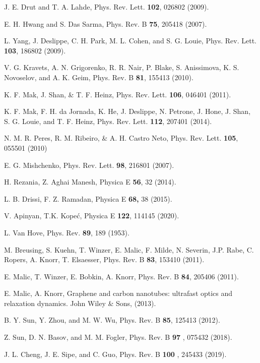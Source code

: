 \documentclass[reprint, superscriptaddress,  aps, pra]{revtex4-2}
\begin{document}
\begin{thebibliography}{99}
 J. E. Drut and T. A. Lahde, Phys. Rev. Lett. \textbf{102},
026802 (2009).

 E. H. Hwang and S. Das Sarma, Phys. Rev. B \textbf{75}, 205418
(2007).

 L. Yang, J. Deslippe, C. H. Park, M. L. Cohen, and S. G.
Louie, Phys. Rev. Lett. \textbf{103}, 186802 (2009).

 V. G. Kravets, A. N. Grigorenko, R. R. Nair, P. Blake, S.
Anissimova, K. S. Novoselov, and A. K. Geim, Phys. Rev. B \textbf{81},
155413 (2010).

 K. F. Mak, J. Shan, \& T. F. Heinz, Phys. Rev. Lett. \textbf{%
106}, 046401 (2011).

 K. F. Mak, F. H. da Jornada, K. He, J. Deslippe, N.
Petrone, J. Hone, J. Shan, S. G. Louie, and T. F. Heinz, Phys. Rev. Lett. 
\textbf{112}, 207401 (2014).

 N. M. R. Peres, R. M. Ribeiro, \& A. H. Castro Neto, Phys.
Rev. Lett. \textbf{105}, 055501 (2010)

 E. G. Mishchenko, Phys. Rev. Lett. \textbf{98}, 216801
(2007).

 H. Rezania, Z. Aghai Manesh, Physica E \textbf{56}, 32 (2014).

 L. B. Drissi, F. Z. Ramadan, Physica E \textbf{68, }38 (2015).

 V. Apinyan, T.K. Kope\'{c}, Physica E \textbf{122}, 114145
(2020).

 L. Van Hove, Phys. Rev. \textbf{89}, 189 (1953).

 M. Breusing, S. Kuehn, T. Winzer, E. Malic, F. Milde, N.
Severin, J.P. Rabe, C. Ropers, A. Knorr, T. Elsaesser, Phys. Rev. B \textbf{%
83}, 153410 (2011).

 E. Malic, T. Winzer, E. Bobkin, A. Knorr, Phys. Rev. B 
\textbf{84}, 205406 (2011).

 E. Malic, A. Knorr, Graphene and carbon nanotubes:
ultrafast optics and relaxation dynamics. John Wiley \& Sons, (2013).

 B. Y. Sun, Y. Zhou, and M. W. Wu, Phys. Rev. B \textbf{85},
125413 (2012).

 Z. Sun, D. N. Basov, and M. M. Fogler, Phys. Rev. B \textbf{97}%
, 075432 (2018).

 J. L. Cheng, J. E. Sipe, and C. Guo, Phys. Rev. B \textbf{100%
}, 245433 (2019).


\end{thebibliography}
\end{document}
